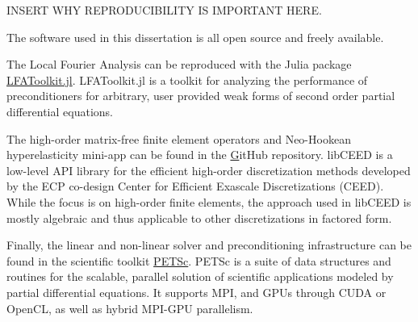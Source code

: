 INSERT WHY REPRODUCIBILITY IS IMPORTANT HERE.

The software used in this dissertation is all open source and freely available.

The Local Fourier Analysis can be reproduced with the Julia package \href{https://www.github.com/jeremylt/LFAToolkit.jl}{LFAToolkit.jl}. LFAToolkit.jl is a toolkit for analyzing the performance of preconditioners for arbitrary, user provided weak forms of second order partial differential equations.

The high-order matrix-free finite element operators and Neo-Hookean hyperelasticity mini-app can be found in the \href{https://www.github.com/CEED/libCEED} GitHub repository.
libCEED is a low-level API library for the efficient high-order discretization methods developed by the ECP co-design Center for Efficient Exascale Discretizations (CEED). While the focus is on high-order finite elements, the approach used in libCEED is mostly algebraic and thus applicable to other discretizations in factored form.

Finally, the linear and non-linear solver and preconditioning infrastructure can be found in the scientific toolkit \href{https://www.mcs.anl.gov/petsc/}{PETSc}.
PETSc is a suite of data structures and routines for the scalable, parallel solution of scientific applications modeled by partial differential equations. It supports MPI, and GPUs through CUDA or OpenCL, as well as hybrid MPI-GPU parallelism.
